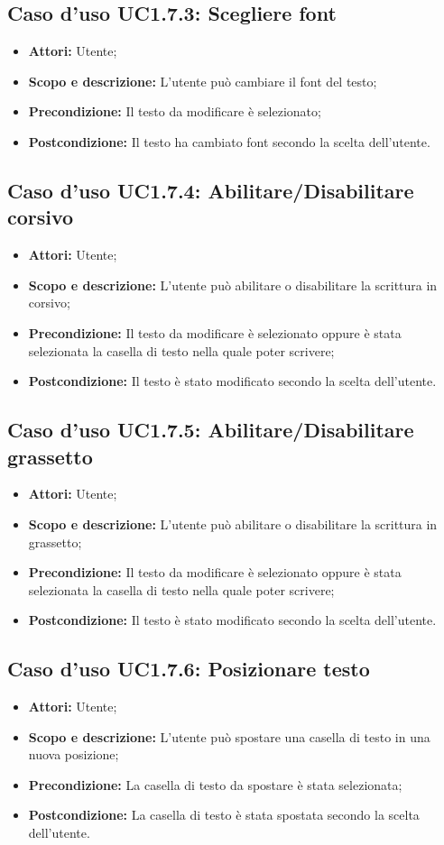 \subsection{Caso d'uso UC1.7.3: Scegliere font}
\begin{itemize}
	\item \textbf{Attori:} Utente;
	\item \textbf{Scopo e descrizione:} L'utente può cambiare il font del testo;
	\item \textbf{Precondizione:} Il testo da modificare è selezionato;
	\item \textbf{Postcondizione:} Il testo ha cambiato font secondo la scelta dell'utente.
\end{itemize}

\subsection{Caso d'uso UC1.7.4: Abilitare/Disabilitare corsivo}
\begin{itemize}
	\item \textbf{Attori:} Utente;
	\item \textbf{Scopo e descrizione:} L'utente può abilitare o disabilitare la scrittura in corsivo;
	\item \textbf{Precondizione:} Il testo da modificare è selezionato oppure è stata selezionata la casella di testo nella quale poter scrivere;
	\item \textbf{Postcondizione:} Il testo è stato modificato secondo la scelta dell'utente.
\end{itemize}

\subsection{Caso d'uso UC1.7.5: Abilitare/Disabilitare grassetto}
\begin{itemize}
	\item \textbf{Attori:} Utente;
	\item \textbf{Scopo e descrizione:} L'utente può abilitare o disabilitare la scrittura in grassetto;
	\item \textbf{Precondizione:} Il testo da modificare è selezionato oppure è stata selezionata la casella di testo nella quale poter scrivere;
	\item \textbf{Postcondizione:} Il testo è stato modificato secondo la scelta dell'utente.
\end{itemize}

\subsection{Caso d'uso UC1.7.6: Posizionare testo}
\begin{itemize}
	\item \textbf{Attori:} Utente;
	\item \textbf{Scopo e descrizione:} L'utente può spostare una casella di testo in una nuova posizione;
	\item \textbf{Precondizione:} La casella di testo da spostare è stata selezionata;
	\item \textbf{Postcondizione:} La casella di testo è stata spostata secondo la scelta dell'utente.
\end{itemize}